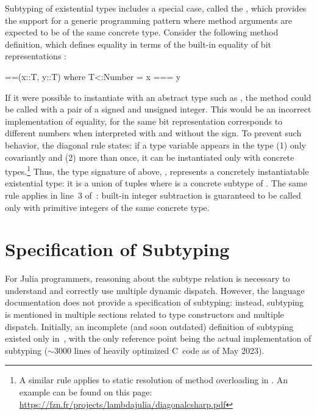 Subtyping of existential types includes a special case, called 
the , which provides the support for
a generic programming pattern where method arguments are expected
to be of the same concrete type.
Consider the following method definition, which defines equality
\cjl{(==)} in terms of the built-in equality of bit representations \cjl{(===)}:
\begin{codeenvd}
\begin{julia}
==(x::T, y::T) where T<:Number = x === y
\end{julia}
\end{codeenvd}
If it were possible to instantiate  with an abstract type such as
, the method could be called with a pair of a signed and unsigned
integer. This would be an incorrect implementation of equality, for the same bit
representation corresponds to different numbers when interpreted with and
without the sign.
To prevent such behavior, the diagonal rule states: if a type variable
appears in the type (1) only covariantly and (2) more than once,
it can be instantiated
only with concrete types.\footnote{A similar rule applies to static resolution
of method overloading in \CSharp. An example can be found on this page:
\href{https://fzn.fr/projects/lambdajulia/diagonalcsharp.pdf}{https://fzn.fr/projects/lambdajulia/diagonalcsharp.pdf}}
Thus, the type signature of \cjl{(==)} above,
, represents a concretely instantiatable
existential type:
it is a union of tuples  where  is a concrete subtype
of . The same rule applies in line~3
of~: built-in integer subtraction  is
guaranteed to be called only with primitive integers of the same concrete type.

\section{Specification of Subtyping}\label{sec:julia-sub:lambda-julia}

For Julia programmers, reasoning about the subtype relation is necessary
to understand and correctly use multiple dynamic dispatch.
However, the language documentation does not provide a specification
of subtyping: instead, subtyping is mentioned in multiple sections related to
type constructors and multiple dispatch.
Initially, an incomplete (and soon outdated) definition of subtyping existed 
only in~\cite{bib:bezanson:julia:2015}, with the only reference point
being the actual implementation of subtyping ($\sim$3000 lines 
of heavily optimized C~code as of May 2023).


